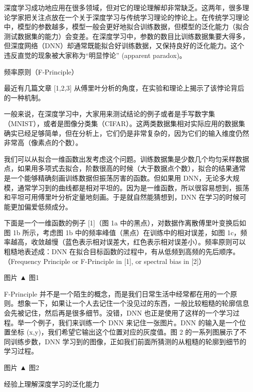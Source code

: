 


深度学习成功地应用在很多领域，但对它的理论理解却非常缺乏。这两年，很多理论学家把关注点放在一个关于深度学习与传统学习理论的悖论上。在传统学习理论中，模型的参数越多，模型一般会更好地拟合训练数据，但模型的泛化能力（拟合测试数据集的能力）会变差。在深度学习中，参数的数目比训练数据集要大得多，但深度网络（DNN）却通常既能拟合好训练数据，又保持良好的泛化能力。这个违反直觉的现象被大家称为“明显悖论” (apparent paradox)。

频率原则（F-Principle）


最近有几篇文章 [1,2,3] 从傅里叶分析的角度，在实验和理论上揭示了该悖论背后的一种机制。

一般来说，在深度学习中，大家用来测试结论的例子或者是手写数字集（MNIST），或者是图像分类集（CIFAR）。这两类数据集相对实际应用的数据集确实已经足够简单，但在分析上，它们仍是非常复杂的，因为它们的输入维度仍然非常高（像素点的个数）。

我们可以从拟合一维函数出发考虑这个问题。训练数据集是少数几个均匀采样数据点，如果用多项式去拟合，阶数很高的时候（大于数据点个数），拟合的结果通常是一个能够精确刻画训练数据但振荡厉害的函数。但如果用 DNN，无论多大规模，通常学习到的曲线都是相对平坦的。因为是一维函数，所以很容易想到，振荡和平坦可用傅里叶分析定量地刻画。于是就自然能猜想到，DNN 在学习的时候可能更加偏爱低频成分。

下面是一个一维函数的例子 [1]（图 1a 中的黑点），对数据作离散傅里叶变换后如图 1b 所示，考虑图 1b 中的频率峰值（黑点）在训练中的相对误差，如图 1c，频率越高，收敛越慢（蓝色表示相对误差大，红色表示相对误差小）。频率原则可以粗糙地表述成：DNN 在拟合目标函数的过程中，有从低频到高频的先后顺序。（Frequency Principle or F-Principle in [1], or spectral bias in [2]）

图片
▲ 图1

F-Principle 并不是一个陌生的概念，而是我们日常生活中经常都在用的一个原则。想象一下，如果让一个人去记住一个没见过的东西，一般比较粗糙的轮廓信息会先被记住，然后再是很多细节。没错，DNN 也正是使用了这样的一个学习过程。举一个例子，我们来训练一个 DNN 来记住一张图片。DNN 的输入是一个位置坐标 (x,y)，我们希望它输出这个位置对应的灰度值。图 2 的一系列图展示了不同训练步数，DNN 学习到的图像，正如我们前面所猜测的从粗糙的轮廓到细节的学习过程。

图片
▲ 图2

经验上理解深度学习的泛化能力


